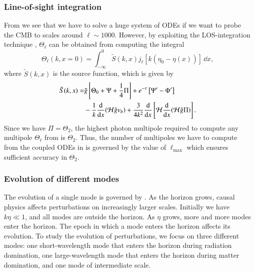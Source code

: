 \subsubsection{Line-of-sight integration}\label{sssec:M3:theory:line_of_sight_integration}
From  we see that we have to solve a huge system of ODEs if we want to probe the CMB to scales around $\ell\sim1000$. However, by exploiting the LOS-integration technique \cite{LOS_integration}, $\Theta_\ell$ can be obtained from computing the integral 
\begin{equation} \label{eq:M3:theory:Theta_ell_LOS_integration}
    \Theta_\ell(k,x=0) = \int_{-\infty}^0 \tilde{S}(k,x) j_\ell [k(\eta_0 - \eta(x))]\,\dd x, 
\end{equation}
where $\tilde{S}(k,x)$ is the source function, which is given by 
\begin{equation} \label{eq:M3:theory:source_function_LOS}
    \begin{split}
        \tilde{S}(k,x) =& \tilde{g} \left[ \Theta_0 + \Psi + \frac{1}{4} \Pi \right] + e^{-\tau}\left[ \Psi' - \Phi' \right] \\
        & - \frac{1}{k}\dv{x}(\mathcal{H} \tilde{g} v_b) + \frac{3}{4k^2}\dv{x}\left[ \mathcal{H} \dv{x}(\mathcal{H}\tilde{g}\Pi) \right].
    \end{split}
\end{equation}
Since we have $\Pi=\Theta_2$, the highest photon multipole required to compute any multipole $\Theta_\ell$ from  is $\Theta_2$. Thus, the number of multipoles we have to compute from the coupled ODEs in  is governed by the value of $\ell_\mathrm{max}$ which ensures sufficient accuracy in $\Theta_2$. 



\subsubsection{Evolution of different modes}\label{sssec:M3:theory:evolution_of_different_modes}
The evolution of a single mode is governed by . As the horizon grows, causal physics affects perturbations on increasingly larger scales. Initially we have $k\eta\ll1$, and all modes are outside the horizon. As $\eta$ grows, more and more modes enter the horizon. The epoch in which a mode enters the horizon affects its evolution. To study the evolution of perturbations, we focus on three different modes: one short-wavelength mode that enters the horizon during radiation domination, one large-wavelength mode that enters the horizon during matter domination, and one mode of intermediate scale. 

